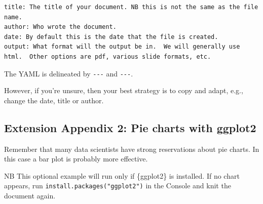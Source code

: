 \documentclass[
]{article}
\begin{document}
\begin{verbatim}
title: The title of your document. NB this is not the same as the file name.
author: Who wrote the document.
date: By default this is the date that the file is created.
output: What format will the output be in.  We will generally use html.  Other options are pdf, various slide formats, etc.
\end{verbatim}

The YAML is delineated by \texttt{-\/-\/-} and \texttt{-\/-\/-}.

However, if you're unsure, then your best strategy is to copy and adapt,
e.g., change the date, title or author.

\subsection{Extension Appendix 2: Pie charts with
ggplot2}\label{ggplot_appendix}

Remember that many data scientists have strong reservations about pie
charts. In this case a bar plot is probably more effective.

NB This optional example will run only if \{ggplot2\} is installed. If
no chart appears, run \texttt{install.packages("ggplot2")} in the
Console and knit the document again.
\end{document}
